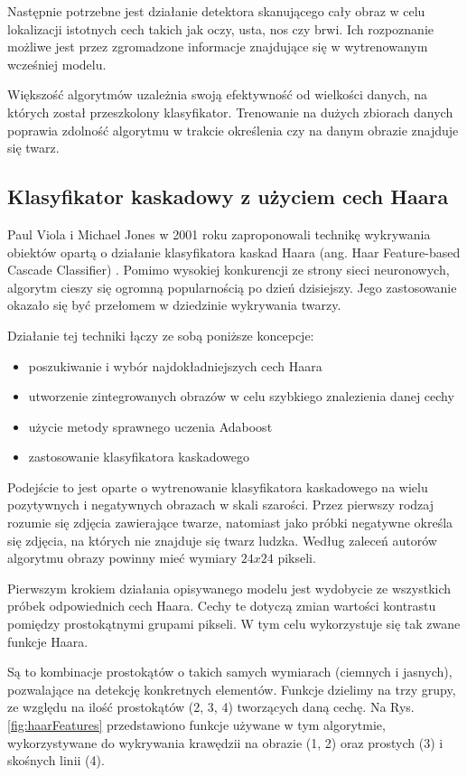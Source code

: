 Następnie potrzebne jest działanie detektora skanującego cały obraz w celu lokalizacji istotnych cech takich jak oczy, usta, nos czy brwi. Ich rozpoznanie możliwe jest przez zgromadzone informacje znajdujące się w wytrenowanym wcześniej modelu.

Większość algorytmów uzależnia swoją efektywność od wielkości danych, na których został przeszkolony klasyfikator. Trenowanie na dużych zbiorach danych poprawia zdolność algorytmu w trakcie określenia czy na danym obrazie znajduje się twarz. \cite{fDetection}

\subsection{Klasyfikator kaskadowy z użyciem cech Haara}
\label{sub:Haar}
Paul Viola i Michael Jones w 2001 roku zaproponowali technikę wykrywania obiektów opartą o działanie klasyfikatora kaskad Haara (ang. Haar Feature-based Cascade Classifier) \cite{haar}. Pomimo wysokiej konkurencji ze strony sieci neuronowych, algorytm cieszy się ogromną popularnością po dzień dzisiejszy. Jego zastosowanie okazało się być przełomem w dziedzinie wykrywania twarzy. 

Działanie tej techniki łączy ze sobą poniższe koncepcje:
\begin{itemize}
    \item poszukiwanie i wybór najdokładniejszych cech Haara
    \item utworzenie zintegrowanych obrazów w celu szybkiego znalezienia danej cechy
    \item użycie metody sprawnego uczenia Adaboost
    \item zastosowanie klasyfikatora kaskadowego
\end{itemize}

Podejście to jest oparte o wytrenowanie klasyfikatora kaskadowego na wielu pozytywnych i negatywnych obrazach w skali szarości. Przez pierwszy rodzaj rozumie się zdjęcia zawierające twarze, natomiast jako próbki negatywne określa się zdjęcia, na których nie znajduje się twarz ludzka. Według zaleceń autorów algorytmu obrazy powinny mieć wymiary $24x24$ pikseli.

Pierwszym krokiem działania opisywanego modelu jest wydobycie ze wszystkich próbek odpowiednich cech Haara. Cechy te dotyczą zmian wartości kontrastu pomiędzy prostokątnymi grupami pikseli. W tym celu wykorzystuje się tak zwane funkcje Haara.

Są to kombinacje prostokątów  o takich samych wymiarach (ciemnych i jasnych), pozwalające na detekcję konkretnych elementów. Funkcje dzielimy na trzy grupy, ze względu na ilość prostokątów (2, 3, 4) tworzących daną cechę. Na Rys. \ref{fig:haarFeatures} przedstawiono funkcje używane w tym algorytmie, wykorzystywane do wykrywania krawędzii na obrazie (1, 2) oraz prostych (3) i skośnych linii (4).

